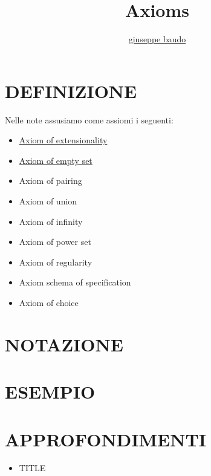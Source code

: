\documentclass[a4paper,10pt]{article}
\title{Axioms}
\author{\href{http://www.baudo.hol.es}{giuseppe baudo}}
\begin{document}
\maketitle

\section{DEFINIZIONE}
Nelle note assusiamo come assiomi i seguenti:

\begin{itemize}
 \item \href{./Extensionality.html}{Axiom of extensionality}
 \item \href{./EmptySet.html}{Axiom of empty set}
 \item Axiom of pairing
 \item Axiom of union
 \item Axiom of infinity
 \item Axiom of power set
 \item Axiom of regularity
 \item Axiom schema of specification
 \item Axiom of choice
\end{itemize}


\section{NOTAZIONE}

\section{ESEMPIO}

\section{APPROFONDIMENTI}
\begin{itemize}
 \item TITLE
\end{itemize}
\end{document}
